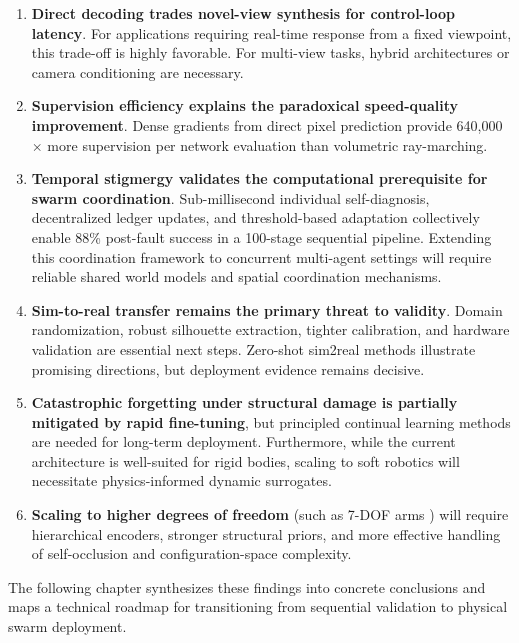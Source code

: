 ﻿\documentclass[12pt,a4paper,oneside]{report}
\begin{document}
\begin{enumerate}
    \item \textbf{Direct decoding trades novel-view synthesis for control-loop latency}. For applications requiring real-time response from a fixed viewpoint, this trade-off is highly favorable. For multi-view tasks, hybrid architectures or camera conditioning are necessary.
    
    \item \textbf{Supervision efficiency explains the paradoxical speed-quality improvement}. Dense gradients from direct pixel prediction provide 640,000$\times$ more supervision per network evaluation than volumetric ray-marching.
    
    \item \textbf{Temporal stigmergy validates the computational prerequisite for swarm coordination}. Sub-millisecond individual self-diagnosis, decentralized ledger updates, and threshold-based adaptation collectively enable 88\% post-fault success in a 100-stage sequential pipeline. Extending this coordination framework to concurrent multi-agent settings will require reliable shared world models and spatial coordination mechanisms.
    
    \item \textbf{Sim-to-real transfer remains the primary threat to validity}. Domain randomization, robust silhouette extraction, tighter calibration, and hardware validation are essential next steps. Zero-shot sim2real methods \cite{qureshi2025splatsim, tang2025semantic} illustrate promising directions, but deployment evidence remains decisive.
    
    \item \textbf{Catastrophic forgetting under structural damage is partially mitigated by rapid fine-tuning}, but principled continual learning methods are needed for long-term deployment. Furthermore, while the current architecture is well-suited for rigid bodies, scaling to soft robotics will necessitate physics-informed dynamic surrogates.
    
    \item \textbf{Scaling to higher degrees of freedom} (such as 7-DOF arms \cite{schulze2024high}) will require hierarchical encoders, stronger structural priors, and more effective handling of self-occlusion and configuration-space complexity.
\end{enumerate}

The following chapter synthesizes these findings into concrete conclusions and maps a technical roadmap for transitioning from sequential validation to physical swarm deployment.
\end{document}
